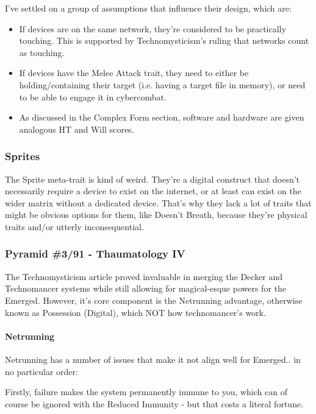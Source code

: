 \begin{multicols*}{2}
	I've settled on a group of assumptions that influence their design, which are:
	
	\begin{itemize}
		\item If devices are on the same network, they're considered to be practically touching. This is supported by Technomysticism's ruling that networks count as touching.
		\item If devices have the Melee Attack trait, they need to either be holding/containing their target (i.e. having a target file in memory), or need to be able to engage it in cybercombat.
		\item As discussed in the Complex Form section, software and hardware are given analogous HT and Will scores.
	\end{itemize}
	
	\subsubsection{Sprites}
	
	The Sprite meta-trait is kind of weird. They're a digital construct that doesn't necessarily require a device to exist on the internet, or at least can exist on the wider matrix without a dedicated device. That's why they lack a lot of traits that might be obvious options for them, like Doesn't Breath, because they're physical traits and/or utterly inconsequential.
	
	\subsubsection{\GURPS Pyramid \#3/91 - Thaumatology IV}
	
	The Technomysticism article proved invaluable in merging the Decker and Technomancer systems while still allowing for magical-esque powers for the Emerged. However, it's core component is the Netrunning advantage, otherwise known as Possession (Digital), which NOT how technomancer's work.
	
	\paragraph{Netrunning}
	
	Netrunning has a number of issues that make it not align well for Emerged.. in no particular order: 
	
	Firstly, failure makes the system permanently immune to you, which can of course be ignored with the Reduced Immunity - but that costs a literal fortune. 
	

\end{multicols*}
